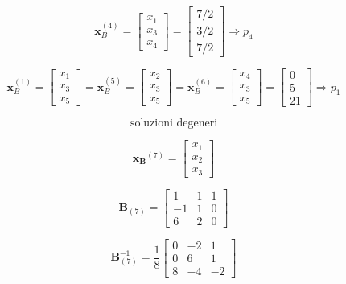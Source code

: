 \documentclass[a4paper, 11pt]{article}
\begin{document}
    
                \[
                    \mathbf{x}_B^{(4)} = \begin{bmatrix} x_1 \\ x_3 \\ x_4 \end{bmatrix} = \begin{bmatrix} 7/2 \\ 3/2 \\ 7/2 \end{bmatrix} \Rightarrow p_4
                \]
    
                
                \[
                    \mathbf{x}_B^{(1)} = \begin{bmatrix} x_1 \\ x_3 \\ x_5 \end{bmatrix} = \mathbf{x}_B^{(5)} = \begin{bmatrix} x_2 \\ x_3 \\ x_5 \end{bmatrix} = \mathbf{x}_B^{(6)} = \begin{bmatrix} x_4 \\ x_3 \\ x_5 \end{bmatrix} = \begin{bmatrix} 0 \\ 5 \\ 21 \end{bmatrix} \Rightarrow p_1
                \]
    

                \[
                    \text{soluzioni degeneri}
                \]


                \[
                    \mathbf{x_B}^{(7)} = \begin{bmatrix} x_1 \\ x_2 \\ x_3 \end{bmatrix}
                \]
                

                \[
                    \mathbf{B}_{(7)} = \begin{bmatrix} 1 & 1 & 1 \\ -1 & 1 & 0 \\ 6 & 2 & 0 \end{bmatrix}
                \]
    

                \[
                    \mathbf{B}_{(7)}^{-1} = \frac{1}{8} \begin{bmatrix} 0 & -2 & 1 \\ 0 & 6 & 1 \\ 8 & -4 & -2 \end{bmatrix}
                \]
\end{document}
